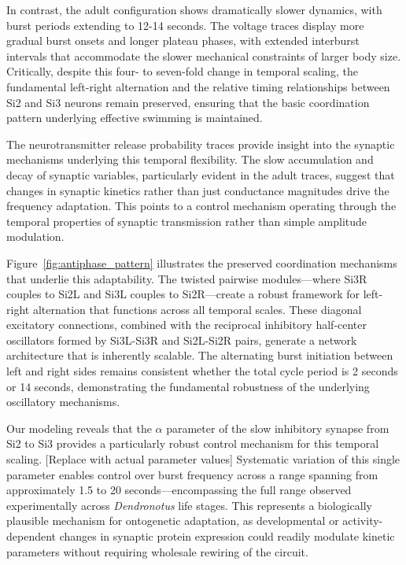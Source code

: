 \documentclass[nofootinbib,aip,amsmath,amssymb,reprint,twocolumn,10pt]{revtex4-2}
\begin{document}
In contrast, the adult configuration shows dramatically slower dynamics, with burst periods extending to 12-14 seconds. The voltage traces display more gradual burst onsets and longer plateau phases, with extended interburst intervals that accommodate the slower mechanical constraints of larger body size. Critically, despite this four- to seven-fold change in temporal scaling, the fundamental left-right alternation and the relative timing relationships between Si2 and Si3 neurons remain preserved, ensuring that the basic coordination pattern underlying effective swimming is maintained.

The neurotransmitter release probability traces provide insight into the synaptic mechanisms underlying this temporal flexibility. The slow accumulation and decay of synaptic variables, particularly evident in the adult traces, suggest that changes in synaptic kinetics rather than just conductance magnitudes drive the frequency adaptation. This points to a control mechanism operating through the temporal properties of synaptic transmission rather than simple amplitude modulation.

Figure~\ref{fig:antiphase_pattern} illustrates the preserved coordination mechanisms that underlie this adaptability. The twisted pairwise modules—where Si3R couples to Si2L and Si3L couples to Si2R—create a robust framework for left-right alternation that functions across all temporal scales. These diagonal excitatory connections, combined with the reciprocal inhibitory half-center oscillators formed by Si3L-Si3R and Si2L-Si2R pairs, generate a network architecture that is inherently scalable. The alternating burst initiation between left and right sides remains consistent whether the total cycle period is 2 seconds or 14 seconds, demonstrating the fundamental robustness of the underlying oscillatory mechanisms.

Our modeling reveals that the $\alpha$ parameter of the slow inhibitory synapse from Si2 to Si3 provides a particularly robust control mechanism for this temporal scaling. {\color{red}[Replace with actual parameter values]} Systematic variation of this single parameter enables control over burst frequency across a range spanning from approximately 1.5 to 20 seconds—encompassing the full range observed experimentally across \textit{Dendronotus} life stages. This represents a biologically plausible mechanism for ontogenetic adaptation, as developmental or activity-dependent changes in synaptic protein expression could readily modulate kinetic parameters without requiring wholesale rewiring of the circuit.
\end{document}

